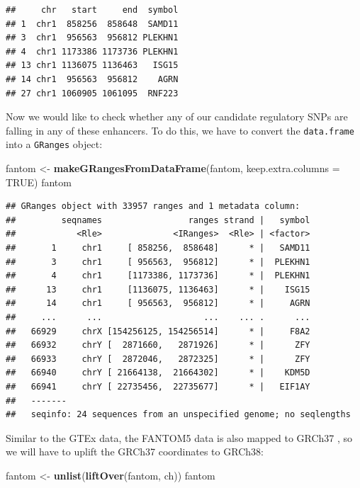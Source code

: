 \documentclass[9pt,a4paper,]{extarticle}
\newenvironment{Shaded}{\begin{snugshade}}{\end{snugshade}}
\newcommand{\KeywordTok}[1]{\textcolor[rgb]{0.13,0.29,0.53}{\textbf{#1}}}
\newcommand{\DataTypeTok}[1]{\textcolor[rgb]{0.13,0.29,0.53}{#1}}
\newcommand{\StringTok}[1]{\textcolor[rgb]{0.31,0.60,0.02}{#1}}
\newcommand{\OtherTok}[1]{\textcolor[rgb]{0.56,0.35,0.01}{#1}}
\newcommand{\NormalTok}[1]{#1}
\begin{document}
\begin{verbatim}
##     chr   start     end  symbol
## 1  chr1  858256  858648  SAMD11
## 3  chr1  956563  956812 PLEKHN1
## 4  chr1 1173386 1173736 PLEKHN1
## 13 chr1 1136075 1136463   ISG15
## 14 chr1  956563  956812    AGRN
## 27 chr1 1060905 1061095  RNF223
\end{verbatim}

Now we would like to check whether any of our candidate regulatory SNPs are falling in any of these enhancers.
To do this, we have to convert the \texttt{data.frame} into a \texttt{GRanges} object:

\begin{Shaded}
\begin{Highlighting}[]
\NormalTok{fantom <-}\StringTok{ }\KeywordTok{makeGRangesFromDataFrame}\NormalTok{(fantom, }\DataTypeTok{keep.extra.columns =} \OtherTok{TRUE}\NormalTok{)}
\NormalTok{fantom}
\end{Highlighting}
\end{Shaded}

\begin{verbatim}
## GRanges object with 33957 ranges and 1 metadata column:
##         seqnames                 ranges strand |   symbol
##            <Rle>              <IRanges>  <Rle> | <factor>
##       1     chr1     [ 858256,  858648]      * |   SAMD11
##       3     chr1     [ 956563,  956812]      * |  PLEKHN1
##       4     chr1     [1173386, 1173736]      * |  PLEKHN1
##      13     chr1     [1136075, 1136463]      * |    ISG15
##      14     chr1     [ 956563,  956812]      * |     AGRN
##     ...      ...                    ...    ... .      ...
##   66929     chrX [154256125, 154256514]      * |     F8A2
##   66932     chrY [  2871660,   2871926]      * |      ZFY
##   66933     chrY [  2872046,   2872325]      * |      ZFY
##   66940     chrY [ 21664138,  21664302]      * |    KDM5D
##   66941     chrY [ 22735456,  22735677]      * |   EIF1AY
##   -------
##   seqinfo: 24 sequences from an unspecified genome; no seqlengths
\end{verbatim}

Similar to the GTEx data, the FANTOM5 data is also mapped to GRCh37 \citep{Fantom2014}, so we will have to uplift the GRCh37 coordinates to GRCh38:

\begin{Shaded}
\begin{Highlighting}[]
\NormalTok{fantom <-}\StringTok{ }\KeywordTok{unlist}\NormalTok{(}\KeywordTok{liftOver}\NormalTok{(fantom, ch))}
\NormalTok{fantom}
\end{Highlighting}
\end{Shaded}
\end{document}
